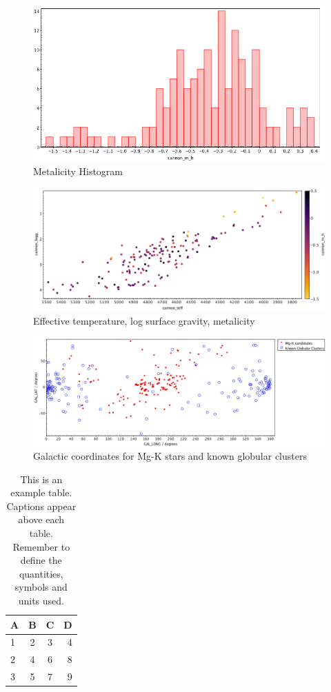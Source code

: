 \documentclass[a4paper,fleqn,usenatbib]{mnras}
\begin{document}
\begin{figure}
	\includegraphics[width=\columnwidth]{m_hhist.png}
    \caption{Metalicity Histogram}
    \label{mhist}
\end{figure}


\begin{figure}
	\includegraphics[width=\columnwidth]{teff_logg.png}
    \caption{Effective temperature, log surface gravity, metalicity}
    \label{mhist}
\end{figure}

\begin{figure}
	\includegraphics[width=\columnwidth]{galcoord.png}
    \caption{Galactic coordinates for Mg-K stars and known globular clusters}
    \label{mhist}
\end{figure}

\begin{table}
	\centering
	\caption{This is an example table. Captions appear above each table.
	Remember to define the quantities, symbols and units used.}
	\label{tab:example_table}
	\begin{tabular}{lccr} %
		\hline
		A & B & C & D\\
		\hline
		1 & 2 & 3 & 4\\
		2 & 4 & 6 & 8\\
		3 & 5 & 7 & 9\\
		\hline
	\end{tabular}
\end{table}
\end{document}
